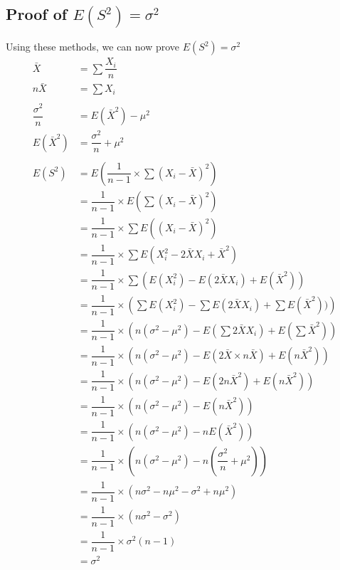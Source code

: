     \subsection{Proof of $E(S^2) = \sigma^2$}
        Using these methods, we can now prove $E(S^2) = \sigma^2$
        \begin{align*}
            \bar{X}  &= \sum{\dfrac{X_i}{n}} \\
            n\bar{X} &= \sum{X_i}\\\\
            \dfrac{\sigma^2}{n} &= E(\bar{X}^2) - \mu^2 \\
            E(\bar{X}^2) &= \dfrac{\sigma^2}{n} + \mu^2
        \\\\
        E(S^2) &= E\left(\dfrac{1}{n-1} \times \sum{(X_i - \bar{X})^2}\right)               \\
            &= \dfrac{1}{n-1} \times E\left(\sum{(X_i - \bar{X})^2}\right)               \\
            &= \dfrac{1}{n-1} \times \sum{E((X_i - \bar{X})^2)}                          \\
            &= \dfrac{1}{n-1} \times \sum{E(X_i^2 - 2\bar{X}X_i + \bar{X}^2)}            \\
            &= \dfrac{1}{n-1} \times \sum{(E(X_i^2) - E(2\bar{X}X_i) + E(\bar{X}^2))}    \\
            &= \dfrac{1}{n-1} \times \left(\sum{E(X_i^2)} - \sum{E(2\bar{X}X_i)} + \sum{E(\bar{X}^2))}\right) \\
            &= \dfrac{1}{n-1} \times \left(n(\sigma^2 - \mu^2) - E\left(\sum{2\bar{X}X_i}\right) + E\left(\sum{\bar{X}^2}\right)\right)\\
            &= \dfrac{1}{n-1} \times \left(n(\sigma^2 - \mu^2) - E\left(2\bar{X} \times n\bar{X}\right) + E\left(n\bar{X}^2\right)\right)\\
            &= \dfrac{1}{n-1} \times \left(n(\sigma^2 - \mu^2) - E\left(2n\bar{X}^2\right) + E\left(n\bar{X}^2\right)\right)\\
            &= \dfrac{1}{n-1} \times \left(n(\sigma^2 - \mu^2) - E\left(n\bar{X}^2\right)\right)\\
            &= \dfrac{1}{n-1} \times \left(n(\sigma^2 - \mu^2) - nE\left(\bar{X}^2\right)\right)\\
            &= \dfrac{1}{n-1} \times \left(n(\sigma^2 - \mu^2) - n\left(\dfrac{\sigma^2}{n} + \mu^2\right)\right)\\
            &= \dfrac{1}{n-1} \times (n\sigma^2 - n\mu^2 - \sigma^2 + n\mu^2)\\
            &= \dfrac{1}{n-1} \times (n\sigma^2 - \sigma^2)\\
            &= \dfrac{1}{n-1} \times \sigma^2(n-1)\\
            &= \sigma^2
        \end{align*}

